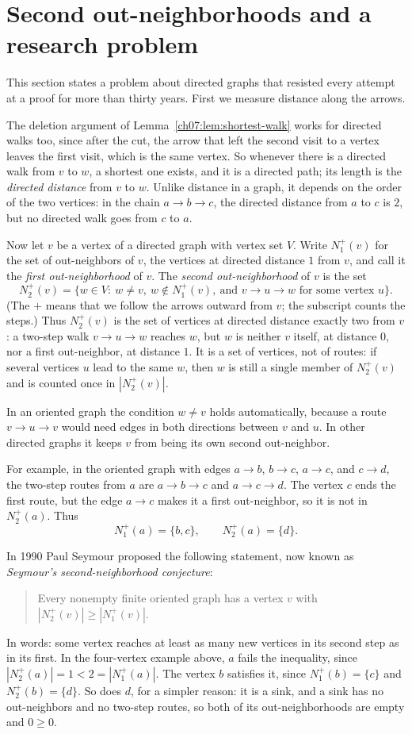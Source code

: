 \section{Second out-neighborhoods and a research problem}\label{ch07:sec:seymour}
This section states a problem about directed graphs that resisted every attempt at a proof for more than thirty years. First we measure distance along the arrows.

The deletion argument of Lemma~\ref{ch07:lem:shortest-walk} works for directed walks too, since after the cut, the arrow that left the second visit to a vertex leaves the first visit, which is the same vertex. So whenever there is a directed walk from $v$ to $w$, a shortest one exists, and it is a directed path; its length is the \emph{directed distance} from $v$ to $w$. Unlike distance in a graph, it depends on the order of the two vertices: in the chain $a\to b\to c$, the directed distance from $a$ to $c$ is $2$, but no directed walk goes from $c$ to $a$.

Now let $v$ be a vertex of a directed graph with vertex set $V$. Write $N_1^+(v)$ for the set of out-neighbors of $v$, the vertices at directed distance $1$ from $v$, and call it the \emph{first out-neighborhood} of $v$. The \emph{second out-neighborhood} of $v$ is the set
\[
N_2^+(v)=\{w\in V:\ w\ne v,\ w\notin N_1^+(v),\ \text{and }v\to u\to w\text{ for some vertex }u\}.
\]
(The $+$ means that we follow the arrows outward from $v$; the subscript counts the steps.) Thus $N_2^+(v)$ is the set of vertices at directed distance exactly two from $v$: a two-step walk $v\to u\to w$ reaches $w$, but $w$ is neither $v$ itself, at distance $0$, nor a first out-neighbor, at distance $1$. It is a set of vertices, not of routes: if several vertices $u$ lead to the same $w$, then $w$ is still a single member of $N_2^+(v)$ and is counted once in $|N_2^+(v)|$.

In an oriented graph the condition $w\ne v$ holds automatically, because a route $v\to u\to v$ would need edges in both directions between $v$ and $u$. In other directed graphs it keeps $v$ from being its own second out-neighbor.

For example, in the oriented graph with edges $a\to b$, $b\to c$, $a\to c$, and $c\to d$, the two-step routes from $a$ are $a\to b\to c$ and $a\to c\to d$. The vertex $c$ ends the first route, but the edge $a\to c$ makes it a first out-neighbor, so it is not in $N_2^+(a)$. Thus
\[
N_1^+(a)=\{b,c\},\qquad N_2^+(a)=\{d\}.
\]

In 1990 Paul Seymour proposed the following statement, now known as \emph{Seymour's second-neighborhood conjecture}:
\begin{quote}
Every nonempty finite oriented graph has a vertex $v$ with $|N_2^+(v)|\ge|N_1^+(v)|$.
\end{quote}
In words: some vertex reaches at least as many new vertices in its second step as in its first. In the four-vertex example above, $a$ fails the inequality, since $|N_2^+(a)|=1<2=|N_1^+(a)|$. The vertex $b$ satisfies it, since $N_1^+(b)=\{c\}$ and $N_2^+(b)=\{d\}$. So does $d$, for a simpler reason: it is a sink, and a sink has no out-neighbors and no two-step routes, so both of its out-neighborhoods are empty and $0\ge0$.

